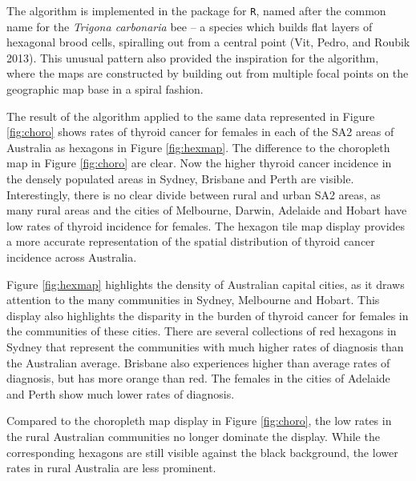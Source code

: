 The algorithm is implemented in the  package for \texttt{R}, named after the common name for the \emph{Trigona carbonaria} bee -- a species which builds flat layers of hexagonal brood cells, spiralling out from a central point (Vit, Pedro, and Roubik 2013). This unusual pattern also provided the inspiration for the algorithm, where the maps are constructed by building out from multiple focal points on the geographic map base in a spiral fashion.

The result of the algorithm applied to the same data represented in Figure \ref{fig:choro} shows rates of thyroid cancer for females in each of the SA2 areas of Australia as hexagons in Figure \ref{fig:hexmap}.
The difference to the choropleth map in Figure \ref{fig:choro} are clear. Now the higher thyroid cancer incidence in the densely populated areas in Sydney, Brisbane and Perth are visible. Interestingly, there is no clear divide between rural and urban SA2 areas, as many rural areas and the cities of Melbourne, Darwin, Adelaide and Hobart have low rates of thyroid incidence for females. The hexagon tile map display provides a more accurate representation of the spatial distribution of thyroid cancer incidence across Australia.

Figure \ref{fig:hexmap} highlights the density of Australian capital cities, as it draws attention to the many communities in Sydney, Melbourne and Hobart. This display also highlights the disparity in the burden of thyroid cancer for females in the communities of these cities. There are several collections of red hexagons in Sydney that represent the communities with much higher rates of diagnosis than the Australian average. Brisbane also experiences higher than average rates of diagnosis, but has more orange than red. The females in the cities of Adelaide and Perth show much lower rates of diagnosis.

Compared to the choropleth map display in Figure \ref{fig:choro}, the low rates in the rural Australian communities no longer dominate the display. While the corresponding hexagons are still visible against the black background, the lower rates in rural Australia are less prominent.

